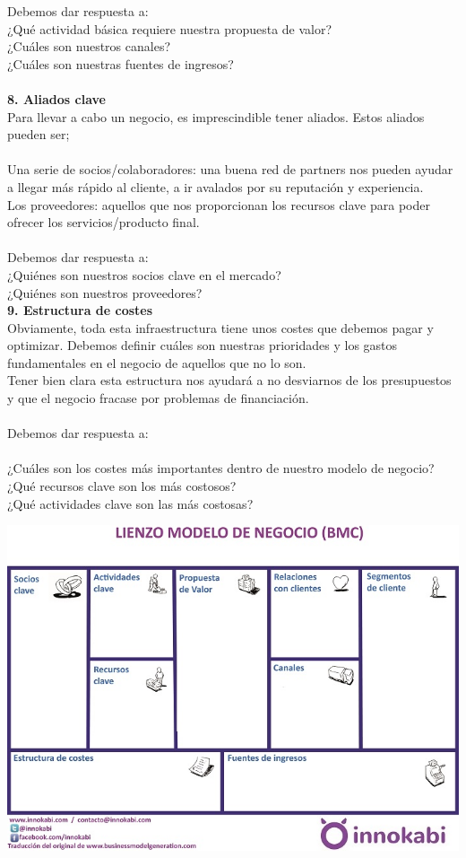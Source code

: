 {Debemos dar respuesta a:\\
¿Qué actividad básica requiere nuestra propuesta de valor?\\
¿Cuáles son nuestros canales?\\
¿Cuáles son nuestras fuentes de ingresos?\\\\
\textbf{8. Aliados clave}\\
Para llevar a cabo un negocio, es imprescindible tener aliados. Estos aliados pueden ser;\\\\
Una serie de socios/colaboradores: una buena red de partners nos pueden ayudar a llegar más rápido al cliente, a ir avalados por su reputación y experiencia.\\
Los proveedores: aquellos que nos proporcionan los recursos clave para poder ofrecer los servicios/producto final.\\\\
Debemos dar respuesta a:\\
¿Quiénes son nuestros socios clave en el mercado?\\
¿Quiénes son nuestros proveedores?\\
\textbf{9. Estructura de costes}\\
Obviamente, toda esta infraestructura tiene unos costes que debemos pagar y optimizar. Debemos definir cuáles son nuestras prioridades y los gastos fundamentales en el negocio de aquellos que no lo son.\\
Tener bien clara esta estructura nos ayudará a no desviarnos de los presupuestos y que el negocio fracase por problemas de financiación.\\\\
Debemos dar respuesta a:\\\\
¿Cuáles son los costes más importantes dentro de nuestro modelo de negocio?\\
¿Qué recursos clave son los más costosos?\\
¿Qué actividades clave son las más costosas?\\
}
\begin{center}
\includegraphics[width=15cm]{./Imagenes/imagen4}
\end{center}


